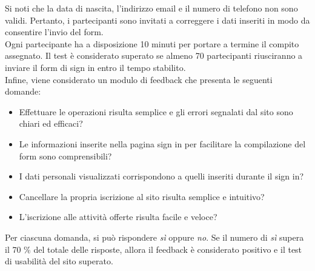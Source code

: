 \documentclass{article}
\begin{document}
Si noti che la data di nascita, l'indirizzo email e il numero di telefono non sono validi. Pertanto, i partecipanti sono invitati a correggere i dati inseriti in modo da consentire l'invio del form.\\
Ogni partecipante ha a disposizione 10 minuti per portare a termine il compito assegnato. Il test è considerato superato se almeno 70 partecipanti riusciranno a inviare il form di sign in entro il tempo stabilito.\\
Infine, viene considerato un modulo di feedback che presenta le seguenti domande:
\begin{itemize}
    \item Effettuare le operazioni risulta semplice e gli errori segnalati dal sito sono chiari ed efficaci?
    \item Le informazioni inserite nella pagina sign in per facilitare la compilazione del form sono comprensibili?
    \item I dati personali visualizzati corrispondono a quelli inseriti durante il sign in?
    \item Cancellare la propria iscrizione al sito risulta semplice e intuitivo? 
    \item L'iscrizione alle attività offerte risulta facile e veloce?
\end{itemize}
Per ciascuna domanda, si può rispondere \textit{sì} oppure \textit{no}. Se il numero di \textit{sì} supera il 70 \% del totale delle risposte, allora il feedback è considerato positivo e il test di usabilità del sito superato.

\vspace{0.7cm}
\end{document}
